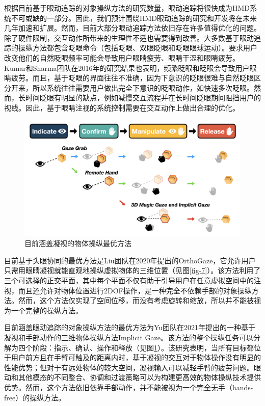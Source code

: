 根据目前基于眼动追踪的对象操纵方法的研究数量，眼动追踪将很快成为HMD系统不可或缺的一部分。因此，我们预计围绕HMD眼动追踪的研究和开发将在未来几年加速和扩展。然而，目前大部分眼动追踪方法依旧存在许多值得优化的问题。除了硬件限制，交互动作所带来的生理性不适也需要得到改善。大多数基于眼动追踪的操纵方法都包含眨眼命令（包括眨眼、双眼眨眼和眨眼眼球运动）。要求用户改变他们的自然眨眼频率可能会导致用户眼睛疲劳、眼睛干涩和眼睛疲劳。Kumar和Sharma团队在2016年的研究结果也表明，频繁眨眼和眨眼会导致用户眼睛疲劳。而且，基于眨眼的界面往往不准确，因为下意识的眨眼很难与自然眨眼区分开来，所以系统往往需要用户做出完全下意识的眨眼动作，如快速多次眨眼。然而，长时间眨眼有明显的缺点，例如减慢交互流程并在长时间眨眼期间阻挡用户的视线。因此，基于眼睛注视的系统控制需要在交互动作上做出合理的优化。

\begin{figure}[b!]
    \centering
    \includegraphics[width=.7\textwidth]{figure/gaze_supported_sota.png}
    \caption{目前涵盖凝视的物体操纵最优方法}
    \label{fig-8}
\end{figure}

目前基于头眼协同的最优方法是Liu团队在2020年提出的OrthoGaze，它允许用户只需用眼睛凝视就能直观地操纵虚拟物体的三维位置（见图\ref{fig-7}）。该方法利用了三个可选择的正交平面，其中每个平面不仅有助于引导用户在任意虚拟空间中的注视，而且还允许对物体位置进行2DOF操作，是一种完全不依赖手部的对象操纵方法。然而，这个方法仅实现了空间位移，而没有考虑旋转和缩放，所以并不能被视为一个完整的操纵方法。

目前涵盖眼动追踪的对象操纵方法的最优方法为Yu团队在2021年提出的一种基于凝视和手部动作的三维物体操纵方法Implicit Gaze。该方法的整个操纵任务可以分解为四个阶段：指示、确认、操作和释放（见图\ref{fig-8}）。该研究表明，当所有目标都位于用户前方且在手臂可触及的距离内时，基于凝视的交互对于物体操作没有明显的性能优势；但对于有远处物体的较大空间，凝视输入可以减轻手臂的疲劳问题。眼动和其他模态的不同整合、协调和过渡策略可以为构建更高效的物体操纵技术提供优势。然而，这个方法依旧依靠手部动作，并不能被视为一个完全无手（hands-free）的操纵方法。

